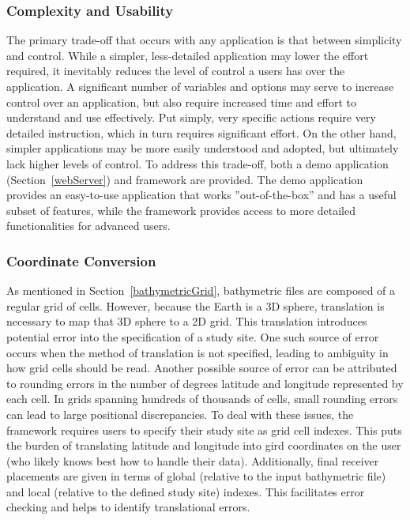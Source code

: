\subsubsection{Complexity and Usability}
The primary trade-off that occurs with any application is that between simplicity and control.  While a simpler, less-detailed application may lower the effort required, it inevitably reduces the level of control a users has over the application.  A significant number of variables and options may serve to increase control over an application, but also require increased time and effort to understand and use effectively.  Put simply, very specific actions require very detailed instruction, which in turn requires significant effort.  On the other hand, simpler applications may be more easily understood and adopted, but ultimately lack higher levels of control.  To address this trade-off, both a demo application (Section~\ref{webServer}) and framework are provided.  The demo application provides an easy-to-use application that works ''out-of-the-box'' and has a useful subset of features, while the framework provides access to more detailed functionalities for advanced users.

\subsubsection{Coordinate Conversion}
As mentioned in Section~\ref{bathymetricGrid}, bathymetric files are composed of a regular grid of cells.  However, because the Earth is a 3D sphere, translation is necessary to map that 3D sphere to a 2D grid.  This translation introduces potential error into the specification of a study site.  One such source of error occurs when the method of translation is not specified, leading to ambiguity in how grid cells should be read.  Another possible source of error can be attributed to rounding errors in the number of degrees latitude and longitude represented by each cell.  In grids spanning hundreds of thousands of cells, small rounding errors can lead to large positional discrepancies.  To deal with these issues, the framework requires users to specify their study site as grid cell indexes.  This puts the burden of translating latitude and longitude into gird coordinates on the user (who likely knows best how to handle their data).  Additionally, final receiver placements are given in terms of global (relative to the input bathymetric file) and local (relative to the defined study site) indexes.  This facilitates error checking and helps to identify translational errors.  


